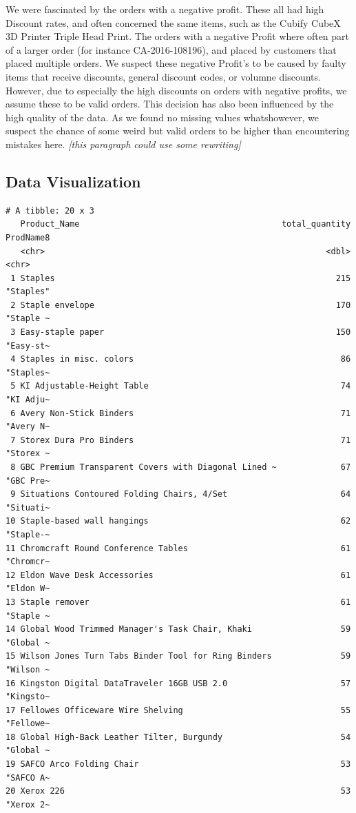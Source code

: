 \documentclass[
]{agujournal2019}
\begin{document}
We were fascinated by the orders with a negative profit. These all had
high Discount rates, and often concerned the same items, such as the
Cubify CubeX 3D Printer Triple Head Print. The orders with a negative
Profit where often part of a larger order (for instance CA-2016-108196),
and placed by customers that placed multiple orders. We suspect these
negative Profit's to be caused by faulty items that receive discounts,
general discount codes, or volumne discounts. However, due to especially
the high discounts on orders with negative profits, we assume these to
be valid orders. This decision has also been influenced by the high
quality of the data. As we found no missing values whatshowever, we
suspect the chance of some weird but valid orders to be higher than
encountering mistakes here. \emph{{[}this paragraph could use some
rewriting{]}}

\subsection{Data Visualization}\label{data-visualization}

\begin{verbatim}
# A tibble: 20 x 3
   Product_Name                                         total_quantity ProdName8
   <chr>                                                         <dbl> <chr>    
 1 Staples                                                         215 "Staples"
 2 Staple envelope                                                 170 "Staple ~
 3 Easy-staple paper                                               150 "Easy-st~
 4 Staples in misc. colors                                          86 "Staples~
 5 KI Adjustable-Height Table                                       74 "KI Adju~
 6 Avery Non-Stick Binders                                          71 "Avery N~
 7 Storex Dura Pro Binders                                          71 "Storex ~
 8 GBC Premium Transparent Covers with Diagonal Lined ~             67 "GBC Pre~
 9 Situations Contoured Folding Chairs, 4/Set                       64 "Situati~
10 Staple-based wall hangings                                       62 "Staple-~
11 Chromcraft Round Conference Tables                               61 "Chromcr~
12 Eldon Wave Desk Accessories                                      61 "Eldon W~
13 Staple remover                                                   61 "Staple ~
14 Global Wood Trimmed Manager's Task Chair, Khaki                  59 "Global ~
15 Wilson Jones Turn Tabs Binder Tool for Ring Binders              59 "Wilson ~
16 Kingston Digital DataTraveler 16GB USB 2.0                       57 "Kingsto~
17 Fellowes Officeware Wire Shelving                                55 "Fellowe~
18 Global High-Back Leather Tilter, Burgundy                        54 "Global ~
19 SAFCO Arco Folding Chair                                         53 "SAFCO A~
20 Xerox 226                                                        53 "Xerox 2~
\end{verbatim}
\end{document}
